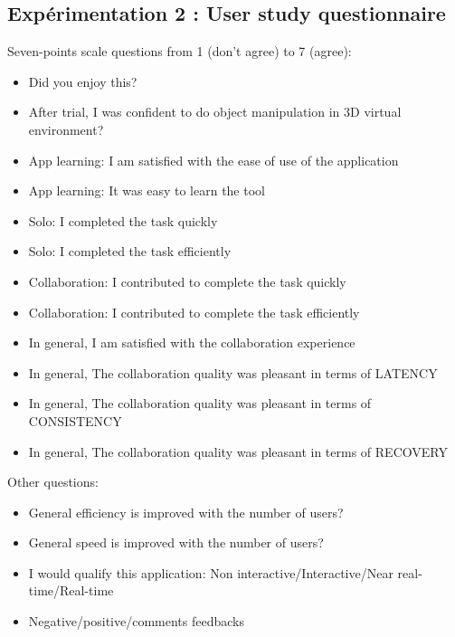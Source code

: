 \begin{appendix}
\section{Expérimentation 2 : User study questionnaire}
\label{app:quest}
Seven-points scale questions from 1 (don't agree) to 7 (agree):
\begin{itemize}
	\item Did you enjoy this?
	\item After trial, I was confident to do object manipulation in 3D virtual 
	environment?
	\item App learning: I am satisfied with the ease of use of the application
	\item App learning: It was easy to learn the tool
	\item Solo: I completed the task quickly
	\item Solo: I completed the task efficiently
	\item Collaboration: I contributed to complete the task quickly
	\item Collaboration: I contributed to complete the task efficiently
	\item In general, I am satisfied with the collaboration experience
	\item In general, The collaboration quality was pleasant in terms of LATENCY
	\item In general, The collaboration quality was pleasant in terms of 
	CONSISTENCY
	\item In general, The collaboration quality was pleasant in terms of RECOVERY
\end{itemize}
Other questions:
\begin{itemize}
	\item General efficiency is improved with the number of users?
	\item General speed is improved with the number of users?
	\item I would qualify this application: Non interactive/Interactive/Near 
	real-time/Real-time
	\item Negative/positive/comments feedbacks
\end{itemize}


\end{appendix}